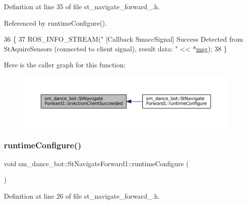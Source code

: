 Definition at line 35 of file st\+\_\+navigate\+\_\+forward\+\_.\+h.



Referenced by runtime\+Configure().


\begin{DoxyCode}
36   \{
37     ROS\_INFO\_STREAM(\textcolor{stringliteral}{" [Callback SmaccSignal] Success Detected from StAquireSensors (connected to client
       signal), result data: "} << *\hyperlink{namespacebattery__monitor__node_ab1920c64448816edd4064e494275fdff}{msg});
38   \}
\end{DoxyCode}
Here is the caller graph for this function\+:
\nopagebreak
\begin{figure}[H]
\begin{center}
\leavevmode
\includegraphics[width=350pt]{structsm__dance__bot_1_1StNavigateForward1_ab5af8fd66b5c39ffef4829233d449d55_icgraph}
\end{center}
\end{figure}
\mbox{\label{structsm__dance__bot_1_1StNavigateForward1_a970f2128e6f29396da2a1545d4dbdc04}} 
\subsubsection{\texorpdfstring{runtime\+Configure()}{runtimeConfigure()}}
{\footnotesize\ttfamily void sm\+\_\+dance\+\_\+bot\+::\+St\+Navigate\+Forward1\+::runtime\+Configure (\begin{DoxyParamCaption}{ }\end{DoxyParamCaption})\hspace{0.3cm}{\ttfamily [inline]}}



Definition at line 26 of file st\+\_\+navigate\+\_\+forward\+\_.\+h.



